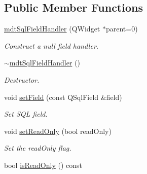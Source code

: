 \subsection*{Public Member Functions}
\begin{DoxyCompactItemize}
\item 
\hyperlink{classmdt_sql_field_handler_a5318b5d67a26163f85ec584fdb1a00bb}{mdtSqlFieldHandler} (QWidget $\ast$parent=0)
\begin{DoxyCompactList}\small\item\em Construct a null field handler. \end{DoxyCompactList}\item 
\hypertarget{classmdt_sql_field_handler_a66e6e5c64033362b70e11745752797e6}{
\hyperlink{classmdt_sql_field_handler_a66e6e5c64033362b70e11745752797e6}{$\sim$mdtSqlFieldHandler} ()}
\label{classmdt_sql_field_handler_a66e6e5c64033362b70e11745752797e6}

\begin{DoxyCompactList}\small\item\em Destructor. \end{DoxyCompactList}\item 
void \hyperlink{classmdt_sql_field_handler_a5c0b3077cf5f2622dd107b892ddde76c}{setField} (const QSqlField \&field)
\begin{DoxyCompactList}\small\item\em Set SQL field. \end{DoxyCompactList}\item 
void \hyperlink{classmdt_sql_field_handler_a0fc937dec713baad88f6def5b7088565}{setReadOnly} (bool readOnly)
\begin{DoxyCompactList}\small\item\em Set the readOnly flag. \end{DoxyCompactList}\item 
\hypertarget{classmdt_sql_field_handler_ae5554c5cab22d0400a206197d66b02c6}{
bool \hyperlink{classmdt_sql_field_handler_ae5554c5cab22d0400a206197d66b02c6}{isReadOnly} () const }
\label{classmdt_sql_field_handler_ae5554c5cab22d0400a206197d66b02c6}


\end{DoxyCompactItemize}
